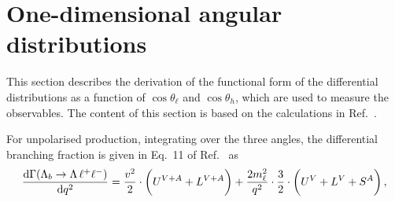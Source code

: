 \section{One-dimensional angular distributions}

This section describes the derivation of the functional form of the differential distributions 
as a function of $\cos\theta_\ell$ and $\cos\theta_h$, which are used to measure
the observables. The content of this section is based on the calculations in Ref.~\cite{Gutsche:2013pp}. 

For unpolarised \Lb production,
%
%
integrating over the three angles, the differential branching fraction is given in Eq.~11 of Ref.~\cite{Gutsche:2013pp} as
\begin{eqnarray}
\label{bjoint00}
\frac{\mathrm{d}\Gamma(\Lambda_b \rightarrow \Lambda \,\ell^{+}\ell^{-})}{\mathrm{d} q^2}=
\frac{v^{2}}{2}\cdot\bigg( U^{V+A} + L^{V+A} \bigg)
+\frac{2m_\ell^{2}}{q^{2}}\cdot\frac{3}{2}\cdot
\bigg( U^{V} + L^{V} + S^{A} \bigg)\,, 
\end{eqnarray}
